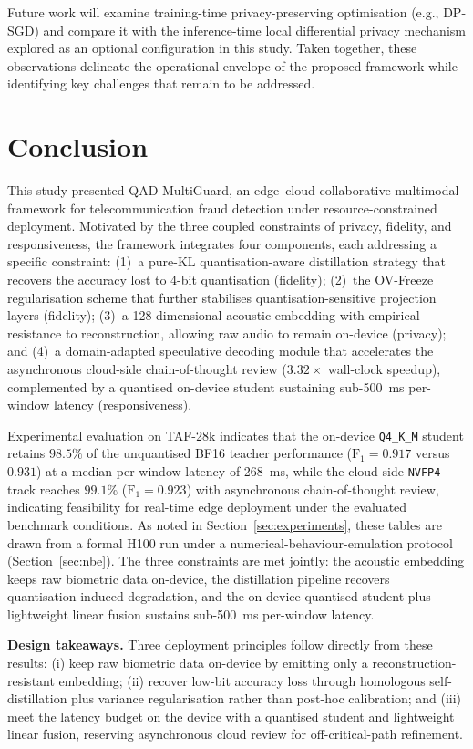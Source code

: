 \documentclass[a4paper,fleqn]{cas-sc}
\begin{document}
Future work will examine training-time privacy-preserving optimisation (e.g., DP-SGD) and compare it with the inference-time local differential privacy mechanism explored as an optional configuration in this study. Taken together, these observations delineate the operational envelope of the proposed framework while identifying key challenges that remain to be addressed.

\section{Conclusion}\label{sec:conclusion}

This study presented QAD-MultiGuard, an edge--cloud collaborative multimodal framework for telecommunication fraud detection under resource-constrained deployment. Motivated by the three coupled constraints of privacy, fidelity, and responsiveness, the framework integrates four components, each addressing a specific constraint: (1)~a pure-KL quantisation-aware distillation strategy that recovers the accuracy lost to 4-bit quantisation (fidelity); (2)~the OV-Freeze regularisation scheme that further stabilises quantisation-sensitive projection layers (fidelity); (3)~a 128-dimensional acoustic embedding with empirical resistance to reconstruction, allowing raw audio to remain on-device (privacy); and (4)~a domain-adapted speculative decoding module that accelerates the asynchronous cloud-side chain-of-thought review ($3.32\times$ wall-clock speedup), complemented by a quantised on-device student sustaining sub-500~ms per-window latency (responsiveness).

Experimental evaluation on TAF-28k indicates that the on-device \texttt{Q4\_K\_M} student retains $98.5\%$ of the unquantised BF16 teacher performance ($\text{F}_1 = 0.917$ versus $0.931$) at a median per-window latency of 268~ms, while the cloud-side \texttt{NVFP4} track reaches $99.1\%$ ($\text{F}_1 = 0.923$) with asynchronous chain-of-thought review, indicating feasibility for real-time edge deployment under the evaluated benchmark conditions. As noted in Section~\ref{sec:experiments}, these tables are drawn from a formal H100 run under a numerical-behaviour-emulation protocol (Section~\ref{sec:nbe}). The three constraints are met jointly: the acoustic embedding keeps raw biometric data on-device, the distillation pipeline recovers quantisation-induced degradation, and the on-device quantised student plus lightweight linear fusion sustains sub-500~ms per-window latency.

\textbf{Design takeaways.} Three deployment principles follow directly from these results: (i) keep raw biometric data on-device by emitting only a reconstruction-resistant embedding; (ii) recover low-bit accuracy loss through homologous self-distillation plus variance regularisation rather than post-hoc calibration; and (iii) meet the latency budget on the device with a quantised student and lightweight linear fusion, reserving asynchronous cloud review for off-critical-path refinement.
\end{document}
